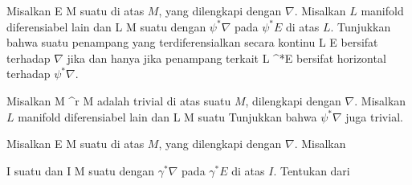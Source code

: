 \setcounter{section}{27}


{}
{

Misalkan
 { E } { M
} {}
suatu
di atas
$M$, yang dilengkapi dengan
$\nabla$. Misalkan $L$ manifold diferensiabel lain dan
\maabb {\psi} { L } { M
} {}
suatu
dengan
$\psi^*\nabla$ pada
$\psi^*E$ di atas $L$. Tunjukkan bahwa suatu penampang yang terdiferensialkan secara kontinu
 { L } { E
} {}
bersifat
terhadap $\nabla$ jika dan hanya jika penampang terkait
 { L } { \psi^*E
} {}
bersifat horizontal terhadap $\psi^* \nabla$.

}
{} {}

{}
{

Misalkan
 {M \times \R^r } { M
} {}
adalah
trivial di atas suatu
$M$, dilengkapi dengan
$\nabla$. Misalkan $L$ manifold diferensiabel lain dan
\maabb {\psi} { L } { M
} {}
suatu
Tunjukkan bahwa
$\psi^*\nabla$
 {} {}
juga trivial.

}
{} {}

{}
{

Misalkan
 { E } { M
} {}
suatu
di atas
$M$, yang dilengkapi dengan
$\nabla$. Misalkan

\mavergleichskette
{\vergleichskette
{ I
}
{ \subseteq }{ \R
}
{  }{
}
{    }{
}
{   }{
}
}
{}{}{}
suatu
dan
\maabb {\gamma} { I } { M
} {}
suatu
dengan
$\gamma^*\nabla$ pada
$\gamma^*E$ di atas $I$. Tentukan
dari

}
{} {}

